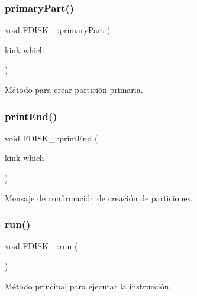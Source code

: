 \subsubsection{\texorpdfstring{primary\+Part()}{primaryPart()}}
{\footnotesize\ttfamily void F\+D\+I\+S\+K\+\_\+\+::primary\+Part (\begin{DoxyParamCaption}\item[{kink}]{which }\end{DoxyParamCaption})\hspace{0.3cm}{\ttfamily [inline]}}

Método para crear partición primaria. \mbox{\label{classFDISK___a48abd8fe6a02cabd370e02a2b87164a3}} 
\subsubsection{\texorpdfstring{print\+End()}{printEnd()}}
{\footnotesize\ttfamily void F\+D\+I\+S\+K\+\_\+\+::print\+End (\begin{DoxyParamCaption}\item[{kink}]{which }\end{DoxyParamCaption})\hspace{0.3cm}{\ttfamily [inline]}}

Mensaje de confirmación de creación de particiones. \mbox{\label{classFDISK___a00c4753fc48745eaf7b9fab40e864a94}} 
\subsubsection{\texorpdfstring{run()}{run()}}
{\footnotesize\ttfamily void F\+D\+I\+S\+K\+\_\+\+::run (\begin{DoxyParamCaption}{ }\end{DoxyParamCaption})\hspace{0.3cm}{\ttfamily [inline]}}

Método principal para ejecutar la instrucción. \mbox{\label{classFDISK___a3cabb04c96798f42985d7c199ba1987f}} 
